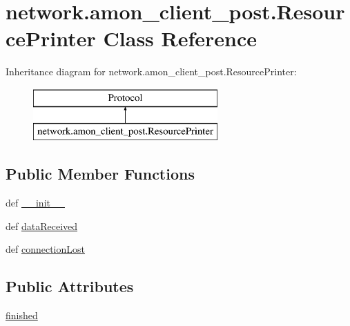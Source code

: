 \hypertarget{classnetwork_1_1amon__client__post_1_1_resource_printer}{\section{network.\-amon\-\_\-client\-\_\-post.\-Resource\-Printer Class Reference}
\label{classnetwork_1_1amon__client__post_1_1_resource_printer}
}
Inheritance diagram for network.\-amon\-\_\-client\-\_\-post.\-Resource\-Printer\-:\begin{figure}[H]
\begin{center}
\leavevmode
\includegraphics[height=2.000000cm]{classnetwork_1_1amon__client__post_1_1_resource_printer}
\end{center}
\end{figure}
\subsection*{Public Member Functions}
\begin{DoxyCompactItemize}
\item 
def \hyperlink{classnetwork_1_1amon__client__post_1_1_resource_printer_a3e2fdf686dbe44f9c23b8a4dffa56eeb}{\-\_\-\-\_\-init\-\_\-\-\_\-}
\item 
def \hyperlink{classnetwork_1_1amon__client__post_1_1_resource_printer_a14fbf073b34272478d4b8227ddd4bbc1}{data\-Received}
\item 
def \hyperlink{classnetwork_1_1amon__client__post_1_1_resource_printer_a8d658a91c195781cb1665ea0f4ce423f}{connection\-Lost}
\end{DoxyCompactItemize}
\subsection*{Public Attributes}
\begin{DoxyCompactItemize}
\item 
\hyperlink{classnetwork_1_1amon__client__post_1_1_resource_printer_a56fa727823bc165a6a851645a652170c}{finished}
\end{DoxyCompactItemize}


